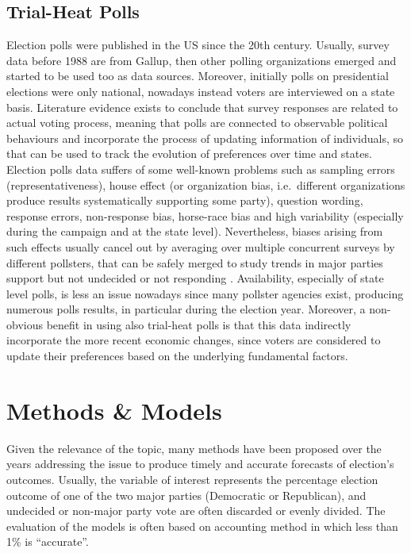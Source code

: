 \documentclass[
  12pt]{article}
\begin{document}
\hypertarget{trial-heat-polls}{%
\subsection{Trial-Heat Polls}\label{trial-heat-polls}}

Election polls were published in the US since the 20th century. Usually,
survey data before 1988 are from Gallup, then other polling
organizations emerged and started to be used too as data sources.
Moreover, initially polls on presidential elections were only national,
nowadays instead voters are interviewed on a state basis. Literature
evidence exists to conclude that survey responses are related to actual
voting process, meaning that polls are connected to observable political
behaviours and incorporate the process of updating information of
individuals, so that can be used to track the evolution of preferences
over time and states. Election polls data suffers of some well-known
problems such as sampling errors (representativeness), house effect (or
organization bias, i.e.~different organizations produce results
systematically supporting some party), question wording, response
errors, non-response bias, horse-race bias and high variability
(especially during the campaign and at the state level). Nevertheless,
biases arising from such effects usually cancel out by averaging over
multiple concurrent surveys by different pollsters, that can be safely
merged to study trends in major parties support but not undecided or not
responding \citep{gel:kin:1993}. Availability, especially of state level
polls, is less an issue nowadays since many pollster agencies exist,
producing numerous polls results, in particular during the election
year. Moreover, a non-obvious benefit in using also trial-heat polls is
that this data indirectly incorporate the more recent economic changes,
since voters are considered to update their preferences based on the
underlying fundamental factors.

\hypertarget{sec-meth}{%
\section{Methods \& Models}\label{sec-meth}}

Given the relevance of the topic, many methods have been proposed over
the years addressing the issue to produce timely and accurate forecasts
of election's outcomes. Usually, the variable of interest represents the
percentage election outcome of one of the two major parties (Democratic
or Republican), and undecided or non-major party vote are often
discarded or evenly divided. The evaluation of the models is often based
on \citet{cam:1996} accounting method in which less than 1\% is
``accurate''.
\end{document}
